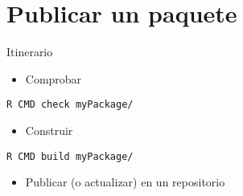 \documentclass[xcolor={usenames,svgnames,dvipsnames}]{beamer}
\begin{document}
\section{Publicar un paquete}
\label{sec:org9c0067a}

\begin{frame}[fragile,label={sec:org1d9cca3}]{Itinerario}
 \begin{itemize}
\item Comprobar
\end{itemize}
\begin{verbatim}
R CMD check myPackage/
\end{verbatim}
\begin{itemize}
\item Construir
\end{itemize}
\begin{verbatim}
R CMD build myPackage/
\end{verbatim}
\begin{itemize}
\item Publicar (o actualizar) en un repositorio
\end{itemize}
\end{frame}
\end{document}
